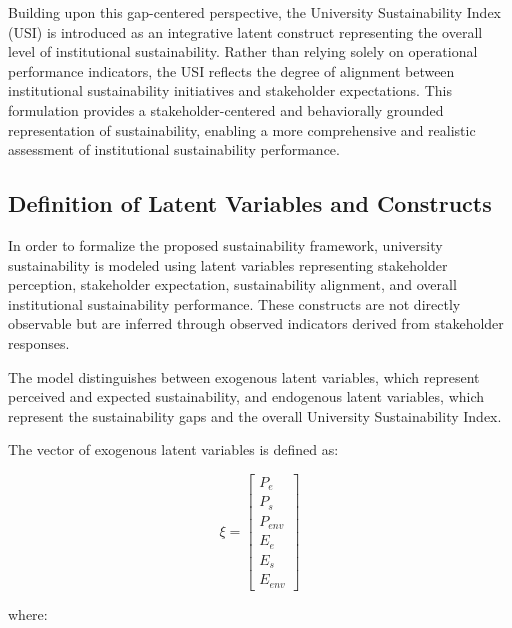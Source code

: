 \documentclass[11pt,a4paper]{article}
\begin{document}
Building upon this gap-centered perspective, the University Sustainability Index (USI) is introduced as an integrative latent construct representing the overall level of institutional sustainability. Rather than relying solely on operational performance indicators, the USI reflects the degree of alignment between institutional sustainability initiatives and stakeholder expectations. This formulation provides a stakeholder-centered and behaviorally grounded representation of sustainability, enabling a more comprehensive and realistic assessment of institutional sustainability performance.


\subsection{Definition of Latent Variables and Constructs}

In order to formalize the proposed sustainability framework, university sustainability is modeled using latent variables representing stakeholder perception, stakeholder expectation, sustainability alignment, and overall institutional sustainability performance. These constructs are not directly observable but are inferred through observed indicators derived from stakeholder responses.

The model distinguishes between exogenous latent variables, which represent perceived and expected sustainability, and endogenous latent variables, which represent the sustainability gaps and the overall University Sustainability Index.

The vector of exogenous latent variables is defined as:

\begin{equation}
\xi =
\begin{bmatrix}
P_e \\
P_s \\
P_{env} \\
E_e \\
E_s \\
E_{env}
\end{bmatrix}
\end{equation}

where:
\end{document}
